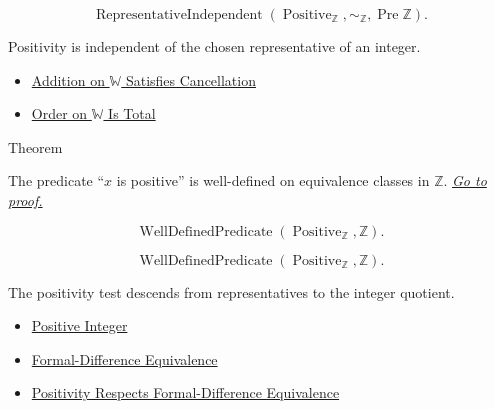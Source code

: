 \begin{remark*}
\[
\operatorname{RepresentativeIndependent}(\operatorname{Positive}_{\mathbb{Z}},
\sim_{\mathbb{Z}},\operatorname{Pre}\mathbb{Z}).
\]
\end{remark*}

\begin{remark*}[Interpretation]
Positivity is independent of the chosen representative of an integer.
\end{remark*}

\begin{dependencies}
\begin{itemize}
  \item \hyperref[thm:addition-on-w-cancellation]{Addition on $\mathbb{W}$ Satisfies Cancellation}
  \item \hyperref[thm:order-on-w-total]{Order on $\mathbb{W}$ Is Total}
\end{itemize}
\end{dependencies}

\begin{theorembox}{Theorem}
\begin{theorem}
\label{thm:positivity-on-z-well-defined}
The predicate ``$x$ is positive'' is well-defined on equivalence classes in
$\mathbb{Z}$.
\hyperref[prf:positivity-on-z-well-defined]{\textit{Go to proof.}}
\end{theorem}
\end{theorembox}

\begin{remark*}
\[
\operatorname{WellDefinedPredicate}(\operatorname{Positive}_{\mathbb{Z}},\mathbb{Z}).
\]
\end{remark*}

\begin{remark*}
\[
\operatorname{WellDefinedPredicate}(\operatorname{Positive}_{\mathbb{Z}},\mathbb{Z}).
\]
\end{remark*}

\begin{remark*}[Interpretation]
The positivity test descends from representatives to the integer quotient.
\end{remark*}

\begin{dependencies}
\begin{itemize}
  \item \hyperref[def:positive-integer]{Positive Integer}
  \item \hyperref[def:formal-difference-equivalence]{Formal-Difference Equivalence}
  \item \hyperref[lem:positivity-respects-equivalence]{Positivity Respects Formal-Difference Equivalence}
\end{itemize}
\end{dependencies}

